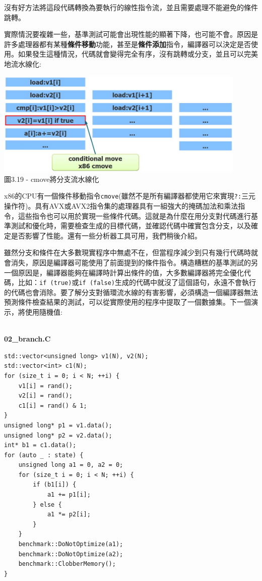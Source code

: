 沒有好方法將這段代碼轉換為要執行的線性指令流，並且需要處理不能避免的條件跳轉。

實際情況要複雜一些，基準測試可能會出現性能的顯著下降，也可能不會。原因是許多處理器都有某種\textbf{條件移動}功能，甚至是\textbf{條件添加}指令，編譯器可以決定是否使用。如果發生這種情況，代碼就會變得完全有序，沒有跳轉或分支，並且可以完美地流水線化:

\begin{center}
\includegraphics[width=0.9\textwidth]{content/1/chapter3/images/19.jpg}\\
圖3.19 - cmove將分支流水線化
\end{center}

x86的CPU有一個條件移動指令\texttt{cmove}(雖然不是所有編譯器都使用它來實現\texttt{?:}三元操作符)。具有AVX或AVX2指令集的處理器具有一組強大的掩碼加法和乘法指令，這些指令也可以用於實現一些條件代碼。這就是為什麼在用分支對代碼進行基準測試和優化時，需要檢查生成的目標代碼，並確認代碼中確實包含分支，以及確定是否影響了性能。還有一些分析器工具可用，我們稍後介紹。

雖然分支和條件在大多數現實程序中無處不在，但當程序減少到只有幾行代碼時就會消失，原因是編譯器可能使用了前面提到的條件指令。構造糟糕的基準測試的另一個原因是，編譯器能夠在編譯時計算出條件的值，大多數編譯器將完全優化代碼，比如：\texttt{if (true)}或\texttt{if (false)}生成的代碼中就沒了這個語句，永遠不會執行的代碼也會消除。要了解分支對循環流水線的有害影響，必須構造一個編譯器無法預測條件檢查結果的測試，可以從實際使用的程序中提取了一個數據集。下一個演示，將使用隨機值:

\hspace*{\fill} \\ %
\noindent
\textbf{02\_branch.C}
\begin{lstlisting}[style=styleCXX]
std::vector<unsigned long> v1(N), v2(N);
std::vector<int> c1(N);
for (size_t i = 0; i < N; ++i) {
	v1[i] = rand();
	v2[i] = rand();
	c1[i] = rand() & 1;
}
unsigned long* p1 = v1.data();
unsigned long* p2 = v2.data();
int* b1 = c1.data();
for (auto _ : state) {
	unsigned long a1 = 0, a2 = 0;
	for (size_t i = 0; i < N; ++i) {
		if (b1[i]) {
			a1 += p1[i];
		} else {
			a1 *= p2[i];
		}
	}
	benchmark::DoNotOptimize(a1);
	benchmark::DoNotOptimize(a2);
	benchmark::ClobberMemory();
}
\end{lstlisting}

